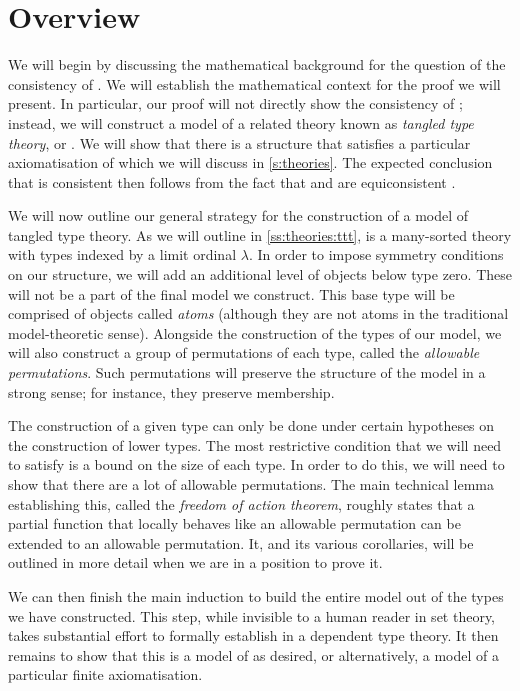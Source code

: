 \section{Overview}
\label{s:overview}

We will begin by discussing the mathematical background for the question of the consistency of \NF.
We will establish the mathematical context for the proof we will present.
In particular, our proof will not directly show the consistency of \NF; instead, we will construct a model of a related theory known as \emph{tangled type theory}, or \TTT.
We will show that there is a structure that satisfies a particular axiomatisation of {\TTT} which we will discuss in \cref{s:theories}.
The expected conclusion that {\NF} is consistent then follows from the fact that {\NF} and {\TTT} are equiconsistent \cite{holmes-ttt}.

We will now outline our general strategy for the construction of a model of tangled type theory.
As we will outline in \cref{ss:theories:ttt}, {\TTT} is a many-sorted theory with types indexed by a limit ordinal \( \lambda \).
In order to impose symmetry conditions on our structure, we will add an additional level of objects below type zero.
These will not be a part of the final model we construct.
This base type will be comprised of objects called \emph{atoms} (although they are not atoms in the traditional model-theoretic sense).
Alongside the construction of the types of our model, we will also construct a group of permutations of each type, called the \emph{allowable permutations}.
Such permutations will preserve the structure of the model in a strong sense; for instance, they preserve membership.

The construction of a given type can only be done under certain hypotheses on the construction of lower types.
The most restrictive condition that we will need to satisfy is a bound on the size of each type.
In order to do this, we will need to show that there are a lot of allowable permutations.
The main technical lemma establishing this, called the \emph{freedom of action theorem}, roughly states that a partial function that locally behaves like an allowable permutation can be extended to an allowable permutation.
It, and its various corollaries, will be outlined in more detail when we are in a position to prove it.

We can then finish the main induction to build the entire model out of the types we have constructed.
This step, while invisible to a human reader in set theory, takes substantial effort to formally establish in a dependent type theory.
It then remains to show that this is a model of {\TTT} as desired, or alternatively, a model of a particular finite axiomatisation.

